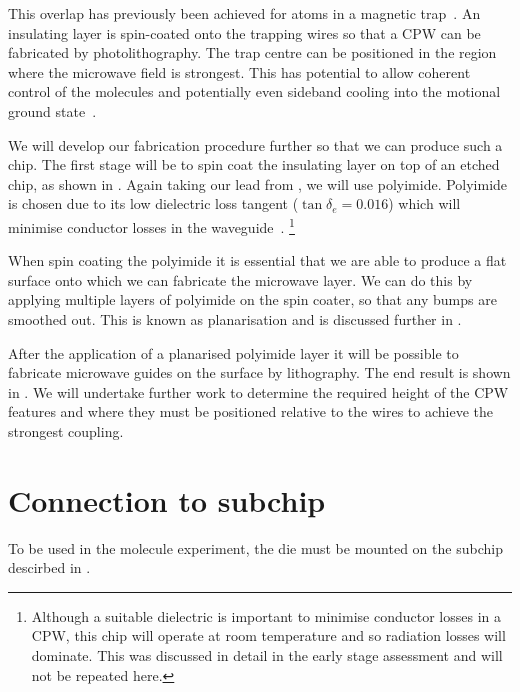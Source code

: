 This overlap has previously been achieved for atoms in a magnetic
trap~\cite{Treutlein2008}. An insulating layer is spin-coated onto the trapping
wires so that a CPW  can be fabricated by
photolithography. The trap centre can be positioned in the region where the
microwave field is strongest. This has potential to allow coherent control of
the molecules and potentially even sideband cooling into the motional ground
state~\cite{Andre2006}.
%

We will develop our fabrication procedure further so that we can produce such a
chip. The first stage will be to spin coat the insulating layer on top of an
etched chip, as shown in . Again taking our
lead from , we will use polyimide. Polyimide is chosen
due to its low dielectric loss tangent ($\tan\delta_e = 0.016$) which will
minimise conductor losses in the waveguide~\cite{Collin2007, Simons2004}.
\footnote{Although a suitable dielectric is important to minimise conductor
losses in a CPW, this chip will operate at room temperature and so radiation
losses will dominate. This was discussed in detail in the early stage
assessment and will not be repeated here.}
%

When spin coating the polyimide it is essential that we are able to produce a
flat surface onto which we can fabricate the microwave layer. We can do this by
applying multiple layers of polyimide on the spin coater, so that any bumps are
smoothed out. This is known as planarisation and is discussed further in
.

After the application of a planarised polyimide layer it will be possible to
fabricate microwave guides on the surface by lithography. The end result is
shown in . We will undertake further work to
determine the required height of the CPW features and where they must be
positioned relative to the wires to achieve the strongest coupling.

\section{Connection to subchip}

To be used in the molecule experiment, the die must be mounted on the subchip
descirbed in .

